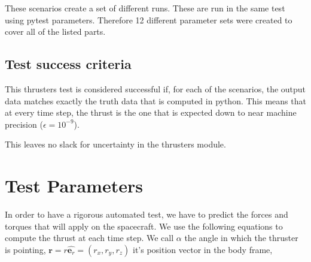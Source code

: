These scenarios create a set of different runs. These are run in the same test using pytest parameters. Therefore 12 different parameter sets were created to cover all of the listed parts.

\subsection{Test success criteria}

This thrusters test is considered successful if, for each of the scenarios, the output data matches exactly the truth data that is computed in python. This means that at every time step, the thrust is the one that is expected down to near machine precision ($\epsilon = 10^{-9}$). 

This leaves no slack for uncertainty in the thrusters module.



\section{Test Parameters}


In order to have a rigorous automated test, we have to predict the forces and torques that will apply on the spacecraft. We use the following equations to compute the thrust at each time step. We call $\alpha$ the angle in which the thruster is pointing, $\bm r = r \hat{\bm e_r}= \left(r_x, r_y, r_z \right)$ it's position vector in the body frame, 

